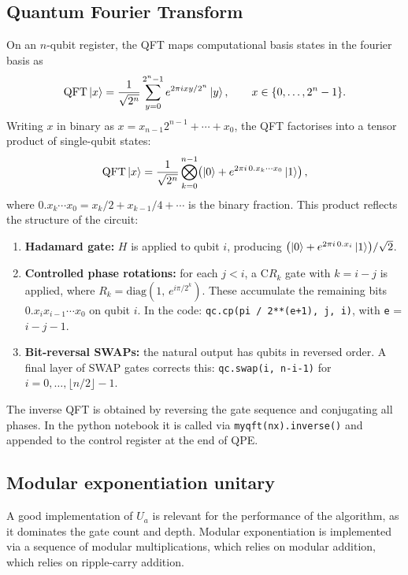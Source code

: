 \documentclass[11pt,a4paper]{article}
\newcommand{\code}[1]{\texttt{#1}}
\begin{document}
\subsection{Quantum Fourier Transform}

On an $n$-qubit register, the QFT maps computational basis states in the fourier basis as
\begin{equation}
    \mathrm{QFT}\ket{x} = \frac{1}{\sqrt{2^n}} \sum_{y=0}^{2^n-1} e^{2\pi i xy/2^n}\ket{y},
    \qquad x \in \{0,\ldots,2^n-1\}.
    \label{eq:qft}
\end{equation}
Writing $x$ in binary as
$x = x_{n-1}2^{n-1} + \cdots + x_0$, the QFT factorises into a tensor product of
single-qubit states:
\begin{equation}
    \mathrm{QFT}\ket{x} = \frac{1}{\sqrt{2^n}}
    \bigotimes_{k=0}^{n-1}\!\left(\ket{0} + e^{2\pi i\, 0.x_k\cdots x_0}\ket{1}\right),
    \label{eq:qft_product}
\end{equation}
where $0.x_k\cdots x_0 = x_k/2 + x_{k-1}/4 + \cdots$ is the binary fraction.
This product reflects the structure of the circuit:

\begin{enumerate}[leftmargin=2em, itemsep=2pt]
    \item \textbf{Hadamard gate:} $H$ is applied to qubit $i$, producing
    $\bigl(\ket{0} + e^{2\pi i\, 0.x_i}\ket{1}\bigr)/\sqrt{2}$.
    \item \textbf{Controlled phase rotations:} for each $j < i$, a C$R_k$
    gate with $k = i-j$ is applied, where $R_k = \mathrm{diag}(1,\, e^{i\pi/2^k})$.
    These accumulate the remaining bits $0.x_i x_{i-1}\cdots x_0$ on qubit $i$.
    In the code: \code{qc.cp(pi\,/\,2**(e+1),\,j,\,i)}, with \code{e} = $i-j-1$.
    \item \textbf{Bit-reversal SWAPs:} the natural output has qubits in reversed order.
    A final layer of SWAP gates corrects this:
    \code{qc.swap(i,\,n-i-1)} for $i=0,\ldots,\lfloor n/2\rfloor - 1$.
\end{enumerate}
 The inverse QFT is obtained by reversing
the gate sequence and conjugating all phases. In the python notebook it is called via
\code{myqft(nx).inverse()} and appended to the control register at the end of QPE.

\subsection{Modular exponentiation unitary}

A good implementation of $U_a$ is relevant for the performance of the algorithm, as it dominates the gate count and depth. 
Modular exponentiation is implemented via a sequence of modular multiplications, which relies on modular addition, which relies on ripple-carry addition.
\end{document}
